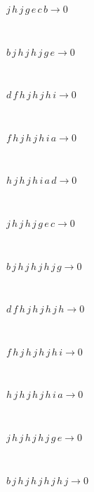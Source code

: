 \begin{minipage}{6in}
$
j\,
 h\,
 j\,
 g\,
 e\,
 c\,
 b\rightarrow 0
$
\end{minipage}\medskip \\
\begin{minipage}{6in}
$
b\,
 j\,
 h\,
 j\,
 h\,
 j\,
 g\,
 e\rightarrow 0
$
\end{minipage}\medskip \\
\begin{minipage}{6in}
$
d\,
 f\,
 h\,
 j\,
 h\,
 j\,
 h\,
 i\rightarrow 0
$
\end{minipage}\medskip \\
\begin{minipage}{6in}
$
f\,
 h\,
 j\,
 h\,
 j\,
 h\,
 i\,
 a\rightarrow 0
$
\end{minipage}\medskip \\
\begin{minipage}{6in}
$
h\,
 j\,
 h\,
 j\,
 h\,
 i\,
 a\,
 d\rightarrow 0
$
\end{minipage}\medskip \\
\begin{minipage}{6in}
$
j\,
 h\,
 j\,
 h\,
 j\,
 g\,
 e\,
 c\rightarrow 0
$
\end{minipage}\medskip \\
\begin{minipage}{6in}
$
b\,
 j\,
 h\,
 j\,
 h\,
 j\,
 h\,
 j\,
 g\rightarrow 0
$
\end{minipage}\medskip \\
\begin{minipage}{6in}
$
d\,
 f\,
 h\,
 j\,
 h\,
 j\,
 h\,
 j\,
 h\rightarrow 0
$
\end{minipage}\medskip \\
\begin{minipage}{6in}
$
f\,
 h\,
 j\,
 h\,
 j\,
 h\,
 j\,
 h\,
 i\rightarrow 0
$
\end{minipage}\medskip \\
\begin{minipage}{6in}
$
h\,
 j\,
 h\,
 j\,
 h\,
 j\,
 h\,
 i\,
 a\rightarrow 0
$
\end{minipage}\medskip \\
\begin{minipage}{6in}
$
j\,
 h\,
 j\,
 h\,
 j\,
 h\,
 j\,
 g\,
 e\rightarrow 0
$
\end{minipage}\medskip \\
\begin{minipage}{6in}
$
b\,
 j\,
 h\,
 j\,
 h\,
 j\,
 h\,
 j\,
 h\,
 j\rightarrow 0
$
\end{minipage}\medskip \\

